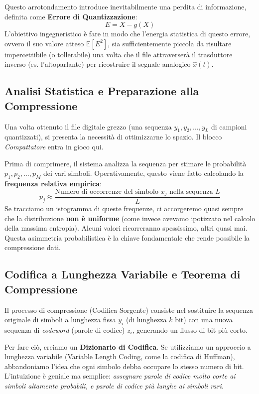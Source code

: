 Questo arrotondamento introduce inevitabilmente una perdita di informazione, definita come \textbf{Errore di Quantizzazione}:
\begin{equation}
E = X - g(X)
\end{equation}
L'obiettivo ingegneristico è fare in modo che l'energia statistica di questo errore, ovvero il suo valore atteso $\mathbb{E}[E^2]$, sia sufficientemente piccola da risultare impercettibile (o tollerabile) una volta che il file attraverserà il trasduttore inverso (es. l'altoparlante) per ricostruire il segnale analogico $\hat{x}(t)$.

\subsection{Analisi Statistica e Preparazione alla Compressione}

Una volta ottenuto il file digitale grezzo (una sequenza $y_1, y_2, \dots, y_L$ di campioni quantizzati), si presenta la necessità di ottimizzarne lo spazio. Il blocco \textit{Compattatore} entra in gioco qui. 

Prima di comprimere, il sistema analizza la sequenza per stimare le probabilità $p_1, p_2, \dots, p_M$ dei vari simboli. Operativamente, questo viene fatto calcolando la \textbf{frequenza relativa empirica}:
\begin{equation}
p_j \approx \frac{\text{Numero di occorrenze del simbolo } x_j \text{ nella sequenza } L}{L}
\end{equation}
Se tracciamo un istogramma di queste frequenze, ci accorgeremo quasi sempre che la distribuzione \textbf{non è uniforme} (come invece avevamo ipotizzato nel calcolo della massima entropia). Alcuni valori ricorreranno spessissimo, altri quasi mai. Questa asimmetria probabilistica è la chiave fondamentale che rende possibile la compressione dati.

\subsection{Codifica a Lunghezza Variabile e Teorema di Compressione}

Il processo di compressione (Codifica Sorgente) consiste nel sostituire la sequenza originale di simboli a lunghezza fissa $y_i$ (di lunghezza $k$ bit) con una nuova sequenza di \textit{codeword} (parole di codice) $z_i$, generando un flusso di bit più corto.

Per fare ciò, creiamo un \textbf{Dizionario di Codifica}. Se utilizziamo un approccio a lunghezza variabile (Variable Length Coding, come la codifica di Huffman), abbandoniamo l'idea che ogni simbolo debba occupare lo stesso numero di bit. L'intuizione è geniale ma semplice: \textit{assegnare parole di codice molto corte ai simboli altamente probabili, e parole di codice più lunghe ai simboli rari}.

